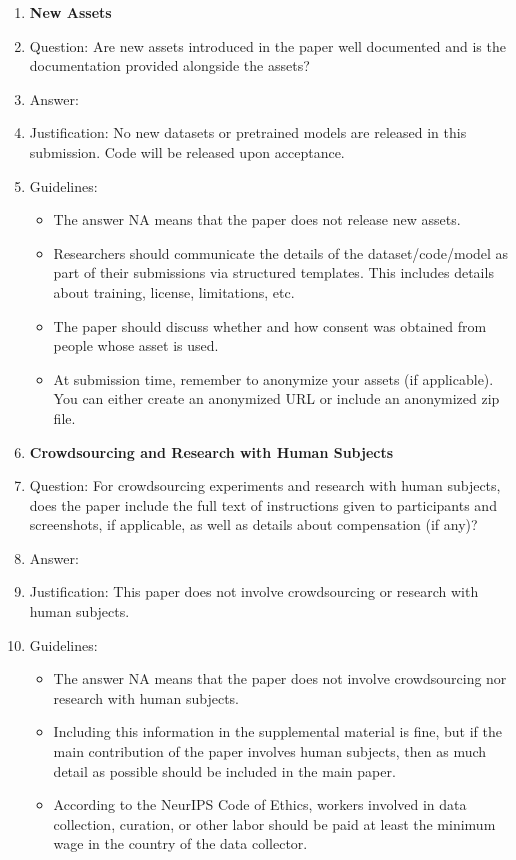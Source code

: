 \documentclass{article}
\theoremstyle{plain}
\theoremstyle{definition}
\begin{document}
\begin{enumerate}
  \item {\bf New Assets}
  \item[] Question: Are new assets introduced in the paper well documented and is the documentation provided alongside the assets?
  \item[] Answer: \answerNA{}
  \item[] Justification: No new datasets or pretrained models are released in this submission. Code will be released upon acceptance.
  \item[] Guidelines:
    \begin{itemize}
      \item The answer NA means that the paper does not release new assets.
      \item Researchers should communicate the details of the dataset/code/model as part of their submissions via structured templates. This includes details about training, license, limitations, etc.
      \item The paper should discuss whether and how consent was obtained from people whose asset is used.
      \item At submission time, remember to anonymize your assets (if applicable). You can either create an anonymized URL or include an anonymized zip file.
    \end{itemize}

  \item {\bf Crowdsourcing and Research with Human Subjects}
  \item[] Question: For crowdsourcing experiments and research with human subjects, does the paper include the full text of instructions given to participants and screenshots, if applicable, as well as details about compensation (if any)?
  \item[] Answer: \answerNA{}
  \item[] Justification: This paper does not involve crowdsourcing or research with human subjects.
  \item[] Guidelines:
    \begin{itemize}
      \item The answer NA means that the paper does not involve crowdsourcing nor research with human subjects.
      \item Including this information in the supplemental material is fine, but if the main contribution of the paper involves human subjects, then as much detail as possible should be included in the main paper.
      \item According to the NeurIPS Code of Ethics, workers involved in data collection, curation, or other labor should be paid at least the minimum wage in the country of the data collector.
    \end{itemize}


\end{enumerate}
\end{document}
